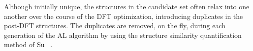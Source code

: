 %
%
Although initially unique, the structures in the candidate set often relax into one another over the course of the DFT optimization, introducing duplicates in the post-DFT structures.
%
The duplicates are removed, on the fly, during each generation of the AL algorithm
by using the structure similarity quantification method of Su ~\cite{Su2017}.
%
